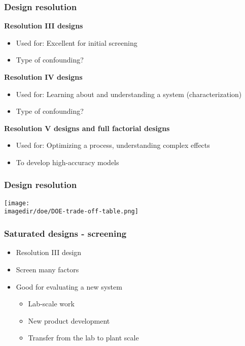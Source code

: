 \begin{frame}\frametitle{Design resolution}

	\textbf{Resolution III designs}
	\begin{itemize}
		\item	Used for: Excellent for initial screening
		\item	Type of confounding?
	\end{itemize}

	\textbf{Resolution IV designs}
	\begin{itemize}
		\item	Used for: Learning about and understanding a system (characterization)
		\item	Type of confounding?
	\end{itemize}

	\textbf{Resolution V designs and full factorial designs}
	\begin{itemize}
		\item	Used for: Optimizing a process, understanding complex effects
		\item	To develop high-accuracy models
	\end{itemize}
\end{frame}

\begin{frame}\frametitle{Design resolution}
	\begin{center}
		\texttt{[image: \\imagedir/doe/DOE-trade-off-table.png]}
	\end{center}
\end{frame}

\begin{frame}\frametitle{Saturated designs - screening}
	\begin{itemize}
		\item	Resolution III design
		\item	Screen many factors
		\item	Good for evaluating a new system
		\begin{itemize}
			\item	Lab-scale work
			\item	New product development
			\item	Transfer from the lab to plant scale
		\end{itemize}
	\end{itemize}
\end{frame}

